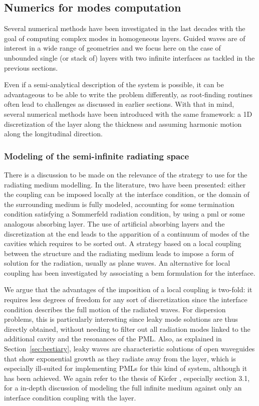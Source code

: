 \subsection{Numerics for modes computation}
\label{ssec:numerics-layers}
Several numerical methods have been investigated in the last decades with the goal of computing complex modes in homogeneous layers. Guided waves are of interest in a wide range of geometries and we focus here on the case of unbounded single (or stack of) layers with two infinite interfaces as tackled in the previous sections. 

Even if a semi-analytical description of the system is possible, it can be advantageous to be able to write the problem differently, as root-finding routines often lead to challenges as discussed in earlier sections. With that in mind, several numerical methods have been introduced with the same framework: a 1D discretization of the layer along the thickness and assuming harmonic motion along the longitudinal direction.

\subsubsection{Modeling of the semi-infinite radiating space}
There is a discussion to be made on the relevance of the strategy to use for the radiating medium modelling. In the literature, two have been presented: either the coupling can be imposed locally at the interface condition, or the domain of the surrounding medium is fully modeled, accounting for some termination condition satisfying a Sommerfeld radiation condition, by using a \acrfull{pml} or some analogous absorbing layer. The use of artificial absorbing layers and the discretization at the end leads to the apparition of a continuum of modes of the cavities \cite{gallezot2017} which requires to be sorted out. A strategy based on a local coupling between the structure and the radiating medium leads to impose a form of solution for the radiation, usually as plane waves\cite{kiefer2019}. An alternative for local coupling has been investigated by associating a \acrfull{bem} formulation for the interface\cite{mazzotti2013}. 

We argue that the advantages of the imposition of a local coupling is two-fold: it requires less degrees of freedom for any sort of discretization since the interface condition describes the full motion of the radiated waves. For dispersion problems, this is particularly interesting since leaky mode solutions are thus directly obtained, without needing to filter out all radiation modes linked to the additional cavity and the resonances of the PML. Also, as explained in Section~\ref{sec:bestiary}, leaky waves are characteristic solutions of open waveguides that show exponential growth as they radiate away from the layer, which is especially ill-suited for implementing PMLs for this kind of system, although it has been achieved\cite{zuo2017, gallezot2017}. We again refer to the thesis of Kiefer \cite{kiefer2022}, especially section 3.1, for a in-depth discussion of modeling the full infinite medium against only an interface condition coupling with the layer.

